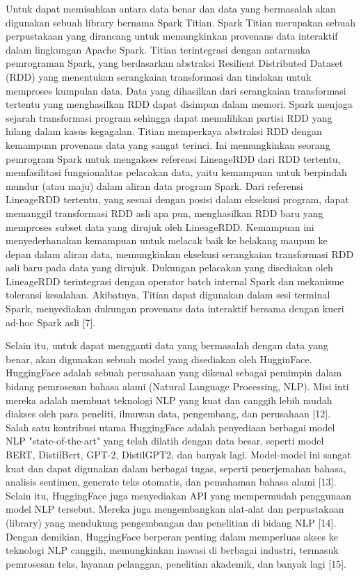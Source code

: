 Untuk dapat memisahkan antara data benar dan data yang bermasalah akan digunakan sebuah library bernama Spark Titian. Spark Titian merupakan sebuah perpustakaan yang dirancang untuk memungkinkan provenans data interaktif dalam lingkungan Apache Spark. Titian terintegrasi dengan antarmuka pemrograman Spark, yang berdasarkan abstraksi Resilient Distributed Dataset (RDD) yang menentukan serangkaian transformasi dan tindakan untuk memproses kumpulan data. Data yang dihasilkan dari serangkaian transformasi tertentu yang menghasilkan RDD dapat disimpan dalam memori. Spark menjaga sejarah transformasi program sehingga dapat memulihkan partisi RDD yang hilang dalam kasus kegagalan. Titian memperkaya abstraksi RDD dengan kemampuan provenans data yang sangat terinci. Ini memungkinkan seorang pemrogram Spark untuk mengakses referensi LineageRDD dari RDD tertentu, memfasilitasi fungsionalitas pelacakan data, yaitu kemampuan untuk berpindah mundur (atau maju) dalam aliran data program Spark. Dari referensi LineageRDD tertentu, yang sesuai dengan posisi dalam eksekusi program, dapat memanggil transformasi RDD asli apa pun, menghasilkan RDD baru yang memproses subset data yang dirujuk oleh LineageRDD. Kemampuan ini menyederhanakan kemampuan untuk melacak baik ke belakang maupun ke depan dalam aliran data, memungkinkan eksekusi serangkaian transformasi RDD asli baru pada data yang dirujuk. Dukungan pelacakan yang disediakan oleh LineageRDD terintegrasi dengan operator batch internal Spark dan mekanisme toleransi kesalahan. Akibatnya, Titian dapat digunakan dalam sesi terminal Spark, menyediakan dukungan provenans data interaktif bersama dengan kueri ad-hoc Spark asli [7].

Selain itu, untuk dapat mengganti data yang bermasalah dengan data yang benar, akan digunakan sebuah model yang disediakan oleh HugginFace. HuggingFace adalah sebuah perusahaan yang dikenal sebagai pemimpin dalam bidang pemrosesan bahasa alami (Natural Language Processing, NLP). Misi inti mereka adalah membuat teknologi NLP yang kuat dan canggih lebih mudah diakses oleh para peneliti, ilmuwan data, pengembang, dan perusahaan [12]. Salah satu kontribusi utama HuggingFace adalah penyediaan berbagai model NLP "state-of-the-art" yang telah dilatih dengan data besar, seperti model BERT, DistilBert, GPT-2, DistilGPT2, dan banyak lagi. Model-model ini sangat kuat dan dapat digunakan dalam berbagai tugas, seperti penerjemahan bahasa, analisis sentimen, generate teks otomatis, dan pemahaman bahasa alami [13]. Selain itu, HuggingFace juga menyediakan API yang mempermudah penggunaan model NLP tersebut. Mereka juga mengembangkan alat-alat dan perpustakaan (library) yang mendukung pengembangan dan penelitian di bidang NLP [14]. Dengan demikian, HuggingFace berperan penting dalam memperluas akses ke teknologi NLP canggih, memungkinkan inovasi di berbagai industri, termasuk pemrosesan teks, layanan pelanggan, penelitian akademik, dan banyak lagi [15].

